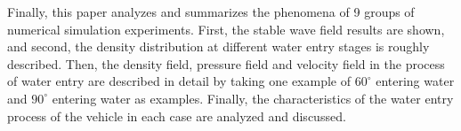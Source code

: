 \begin{abstract*}
  Finally, this paper analyzes and summarizes the phenomena of 9 groups of numerical simulation experiments. First, the stable wave field results are shown, and second, the density distribution at different water entry stages is roughly described. Then, the density field, pressure field and velocity field in the process of water entry are described in detail by taking one example of $60 ^\circ$ entering water and $90 ^\circ$ entering water as examples. Finally, the characteristics of the water entry process of the vehicle in each case are analyzed and discussed.
\end{abstract*}
